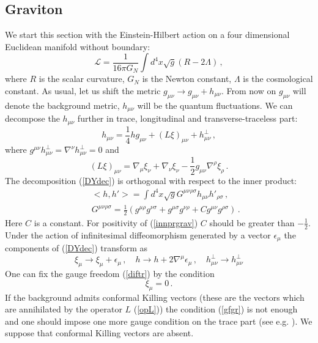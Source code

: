 \subsection{Graviton}
We start this section with the Einstein-Hilbert action
on a four dimensional Euclidean manifold without boundary:
\begin{equation}
\mathcal{L}=\frac 1{16\pi G_N} \int d^4 x\sqrt{g} (R-2\Lambda )\,,
\label{gract}
\end{equation}
where $R$ is the scalar curvature,
$G_N$ is the Newton constant, $\Lambda$ is the
cosmological constant.
 As usual, let us shift the metric 
$g_{\mu\nu}\to g_{\mu\nu} +h_{\mu\nu}$. From now on
$g_{\mu\nu}$ will denote the background metric, $h_{\mu\nu}$
will be the quantum fluctuations. We can decompose the 
$h_{\mu\nu}$ further in trace, longitudinal and transverse-traceless
part:
\begin{equation}
h_{\mu\nu} =\frac 14 hg_{\mu\nu} +(L\xi )_{\mu\nu} +
h^\perp_{\mu\nu} \,, \label{DYdec}
\end{equation}
where $g^{\mu\nu}h^\perp_{\mu\nu}=\nabla^\nu h^\perp_{\mu\nu}=0$
and
\begin{equation}
(L\xi )_{\mu\nu}=\nabla_\mu \xi_\nu +\nabla_\nu \xi_\nu
-\frac 12 g_{\mu\nu} \nabla^\rho \xi_\rho \,.
\label{opL}
\end{equation}
The decomposition (\ref{DYdec}) is orthogonal with respect to
the inner product:
\begin{eqnarray}
&& <h, h'>=\int d^4x \sqrt {g}
G^{\mu \nu \rho \sigma} h_{\mu \nu}
h'_{\rho \sigma} \,,\label{innprgrav} \\
&&G^{\mu \nu \rho \sigma}=\frac 12 (g^{\mu \rho} g^{\nu \sigma}+
g^{\mu \sigma} g^{\nu \rho} +Cg^{\mu \nu}g^{\rho \sigma})
\,. \nonumber 
\end{eqnarray}
Here $C$ is a constant. For positivity of (\ref{innprgrav}) $C$
should be greater than $-\frac 12$.
Under the action of infinitesimal diffeomorphism generated by
a vector $\epsilon_\mu$ the components of (\ref{DYdec}) transform
as
\begin{equation}
\xi_\mu \to \xi_\mu +\epsilon_\mu \,,\quad
h \to h+2\nabla^\mu \epsilon_\mu\,,\quad
h_{\mu \nu}^\perp \to h_{\mu \nu}^\perp \label{diftr}
\end{equation}
One can fix the gauge freedom (\ref{diftr}) by the condition
\begin{equation}
\xi_\mu =0\,. \label{gfgr}
\end{equation}
If the background admits conformal Killing vectors (these are
the vectors which are annihilated by the operator $L$
(\ref{opL})) the condition (\ref{gfgr}) is not enough and
one should impose one more gauge condition on the trace
part (see e.g. \cite{Vassilevich:1993rk}). We suppose
that conformal Killing vectors are absent.

